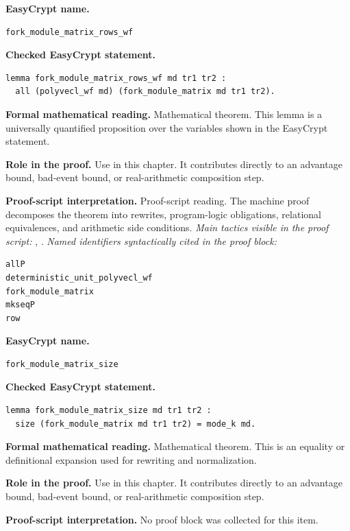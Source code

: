 \begin{formaltheorem}
\noindent\textbf{EasyCrypt name.}
\begin{lstlisting}[language=EasyCrypt,basicstyle=\ttfamily\scriptsize]
fork_module_matrix_rows_wf
\end{lstlisting}
\noindent\textbf{Checked EasyCrypt statement.}
\begin{lstlisting}[language=EasyCrypt,basicstyle=\ttfamily\scriptsize]
lemma fork_module_matrix_rows_wf md tr1 tr2 :
  all (polyvecl_wf md) (fork_module_matrix md tr1 tr2).
\end{lstlisting}
\noindent\textbf{Formal mathematical reading.}
Mathematical theorem. This lemma is a universally quantified proposition over the variables shown in the EasyCrypt statement.

\noindent\textbf{Role in the proof.}
Use in this chapter. It contributes directly to an advantage bound, bad-event bound, or real-arithmetic composition step.

\noindent\textbf{Proof-script interpretation.}
Proof-script reading. The machine proof decomposes the theorem into rewrites, program-logic obligations, relational equivalences, and arithmetic side conditions.
\emph{Main tactics visible in the proof script:} , .
\emph{Named identifiers syntactically cited in the proof block:}
\begin{lstlisting}[language=EasyCrypt,basicstyle=\ttfamily\scriptsize]
allP
deterministic_unit_polyvecl_wf
fork_module_matrix
mkseqP
row
\end{lstlisting}

\end{formaltheorem}

\begin{formaltheorem}
\noindent\textbf{EasyCrypt name.}
\begin{lstlisting}[language=EasyCrypt,basicstyle=\ttfamily\scriptsize]
fork_module_matrix_size
\end{lstlisting}
\noindent\textbf{Checked EasyCrypt statement.}
\begin{lstlisting}[language=EasyCrypt,basicstyle=\ttfamily\scriptsize]
lemma fork_module_matrix_size md tr1 tr2 :
  size (fork_module_matrix md tr1 tr2) = mode_k md.
\end{lstlisting}
\noindent\textbf{Formal mathematical reading.}
Mathematical theorem. This is an equality or definitional expansion used for rewriting and normalization.

\noindent\textbf{Role in the proof.}
Use in this chapter. It contributes directly to an advantage bound, bad-event bound, or real-arithmetic composition step.

\noindent\textbf{Proof-script interpretation.}
No proof block was collected for this item.

\end{formaltheorem}

